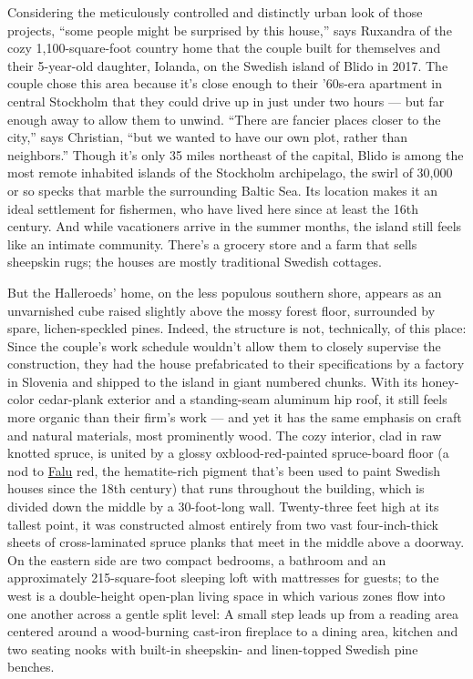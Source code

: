 Considering the meticulously controlled and distinctly urban look of
those projects, ``some people might be surprised by this house,'' says
Ruxandra of the cozy 1,100-square-foot country home that the couple
built for themselves and their 5-year-old daughter, Iolanda, on the
Swedish island of Blido in 2017. The couple chose this area because it's
close enough to their '60s-era apartment in central Stockholm that they
could drive up in just under two hours --- but far enough away to allow
them to unwind. ``There are fancier places closer to the city,'' says
Christian, ``but we wanted to have our own plot, rather than
neighbors.'' Though it's only 35 miles northeast of the capital, Blido
is among the most remote inhabited islands of the Stockholm archipelago,
the swirl of 30,000 or so specks that marble the surrounding Baltic Sea.
Its location makes it an ideal settlement for fishermen, who have lived
here since at least the 16th century. And while vacationers arrive in
the summer months, the island still feels like an intimate community.
There's a grocery store and a farm that sells sheepskin rugs; the houses
are mostly traditional Swedish cottages.

But the Halleroeds' home, on the less populous southern shore, appears
as an unvarnished cube raised slightly above the mossy forest floor,
surrounded by spare, lichen-speckled pines. Indeed, the structure is
not, technically, of this place: Since the couple's work schedule
wouldn't allow them to closely supervise the construction, they had the
house prefabricated to their specifications by a factory in Slovenia and
shipped to the island in giant numbered chunks. With its honey-color
cedar-plank exterior and a standing-seam aluminum hip roof, it still
feels more organic than their firm's work --- and yet it has the same
emphasis on craft and natural materials, most prominently wood. The cozy
interior, clad in raw knotted spruce, is united by a glossy
oxblood-red-painted spruce-board floor (a nod to
\href{https://www.nytimes3xbfgragh.onion/2015/09/06/travel/sweden-islands-runmaro.html}{Falu}
red, the hematite-rich pigment that's been used to paint Swedish houses
since the 18th century) that runs throughout the building, which is
divided down the middle by a 30-foot-long wall. Twenty-three feet high
at its tallest point, it was constructed almost entirely from two vast
four-inch-thick sheets of cross-laminated spruce planks that meet in the
middle above a doorway. On the eastern side are two compact bedrooms, a
bathroom and an approximately 215-square-foot sleeping loft with
mattresses for guests; to the west is a double-height open-plan living
space in which various zones flow into one another across a gentle split
level: A small step leads up from a reading area centered around a
wood-burning cast-iron fireplace to a dining area, kitchen and two
seating nooks with built-in sheepskin- and linen-topped Swedish pine
benches.

